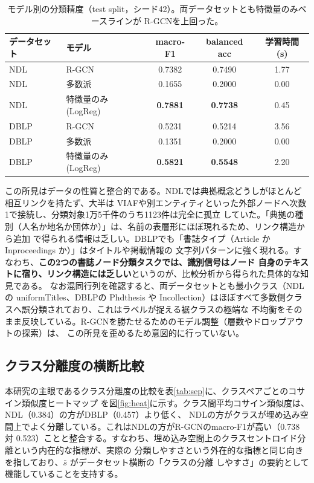 \documentclass[dvipdfmx,twoside,11pt]{article}
\begin{document}
\begin{table}[t]
\centering
\caption{モデル別の分類精度（test split，シード42）。両データセットとも特徴量のみベースラインが
R-GCNを上回った。}
\label{tab:acc}
\begin{tabular}{llccc}
\toprule
データセット & モデル & macro-F1 & balanced acc & 学習時間 (s) \\
\midrule
NDL  & R-GCN                    & 0.7382 & 0.7490 & 1.77 \\
NDL  & 多数派                   & 0.1655 & 0.2000 & 0.00 \\
NDL  & 特徴量のみ (LogReg)      & \textbf{0.7881} & \textbf{0.7738} & 0.45 \\
\midrule
DBLP & R-GCN                    & 0.5231 & 0.5214 & 3.56 \\
DBLP & 多数派                   & 0.1351 & 0.2000 & 0.00 \\
DBLP & 特徴量のみ (LogReg)      & \textbf{0.5821} & \textbf{0.5548} & 2.20 \\
\bottomrule
\end{tabular}
\end{table}

この所見はデータの性質と整合的である。NDLでは典拠概念どうしがほとんど相互リンクを持たず、大半は
VIAFや別エンティティといった外部ノードへ次数1で接続し、分類対象1万5千件のうち1123件は完全に孤立
していた。「典拠の種別（人名か地名か団体か）」は、名前の表層形にほぼ現れるため、リンク構造から追加
で得られる情報は乏しい。DBLPでも「書誌タイプ（Article か Inproceedings か）」はタイトルや掲載情報の
文字列パターンに強く現れる。すなわち、\textbf{この2つの書誌ノード分類タスクでは、識別信号はノード
自身のテキストに宿り、リンク構造には乏しい}というのが、比較分析から得られた具体的な知見である。
なお混同行列を確認すると、両データセットとも最小クラス（NDLの uniformTitles、DBLPの Phdthesis や
Incollection）はほぼすべて多数側クラスへ誤分類されており、これはラベルが捉える裾クラスの極端な
不均衡をそのまま反映している。R-GCNを勝たせるためのモデル調整（層数やドロップアウトの探索）は、
この所見を歪めるため意図的に行っていない。

\subsection{クラス分離度の横断比較}

本研究の主眼であるクラス分離度の比較を表\ref{tab:sep}に、クラスペアごとのコサイン類似度ヒートマップ
を図\ref{fig:heat}に示す。クラス間平均コサイン類似度は、NDL（0.384）の方がDBLP（0.457）より低く、
NDLの方がクラスが埋め込み空間上でよく分離している。これはNDLの方がR-GCNのmacro-F1が高い（0.738 対
0.523）ことと整合する。すなわち、埋め込み空間上のクラスセントロイド分離という内在的な指標が、実際の
分類しやすさという外在的な指標と同じ向きを指しており、$\bar{s}$ がデータセット横断の「クラスの分離
しやすさ」の要約として機能していることを支持する。
\end{document}
